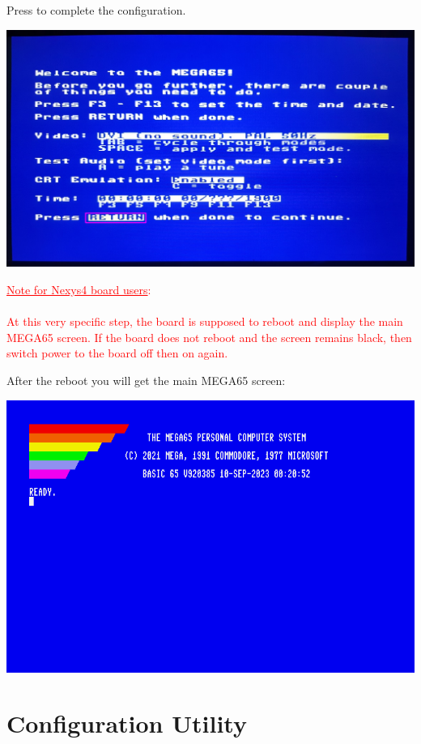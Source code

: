 Press  to complete the configuration.

\begin{center}
  \includegraphics[width=\linewidth]{images/img011_final_boot_05.png}
\end{center}

\ifdefined\printmanual
\else
\textcolor{red}{\underline{Note for Nexys4 board users}: \\
\\
  At this very specific step, the board is supposed to reboot and display the main MEGA65 screen. If the board does not reboot and the screen remains black, then switch power to the board off then on again.}
\fi

After the reboot you will get the main MEGA65 screen:

\begin{center}
  \includegraphics[width=0.9\linewidth]{images/img011_final_boot_06.png}
\end{center}

\section{Configuration Utility}
\label{sec:configuration-utility}

